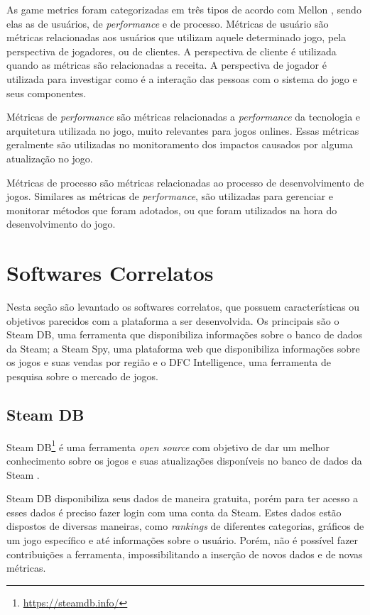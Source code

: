 As game metrics foram categorizadas em três tipos de acordo com Mellon \cite{game_metrics}, sendo elas as de usuários, de \textit{performance} e de processo.
Métricas de usuário são métricas relacionadas aos usuários que utilizam aquele determinado jogo, pela perspectiva de jogadores, ou de clientes. A perspectiva de cliente é utilizada quando as métricas são relacionadas a receita. A perspectiva de jogador é utilizada para investigar como é a interação das pessoas com o sistema do jogo e seus componentes.

Métricas de \textit{performance} são métricas relacionadas a \textit{performance} da tecnologia e arquitetura utilizada no jogo, muito relevantes para jogos onlines. Essas métricas geralmente são utilizadas no monitoramento dos impactos causados por alguma atualização no jogo.

Métricas de processo são métricas relacionadas ao processo de desenvolvimento de jogos. Similares as métricas de \textit{performance}, são utilizadas para gerenciar e monitorar métodos que foram adotados, ou que foram utilizados na hora do desenvolvimento do jogo. 
\section{Softwares Correlatos}
Nesta seção são levantado os softwares correlatos, que possuem características ou objetivos parecidos com a plataforma a ser desenvolvida. Os principais são o Steam DB, uma ferramenta que disponibiliza informações sobre o banco de dados da Steam; a Steam Spy, uma plataforma web que disponibiliza informações sobre os jogos e suas vendas por região e o DFC Intelligence, uma ferramenta de pesquisa sobre o mercado de jogos.
\subsection{Steam DB}
Steam DB\footnote[1]{\url{https://steamdb.info/}} é uma ferramenta \textit{open source} com objetivo de dar um melhor conhecimento sobre os jogos e suas atualizações disponíveis no banco de dados da Steam \cite{steam_db}.

Steam DB disponibiliza seus dados de maneira gratuita, porém para ter acesso a esses dados é preciso fazer login com uma conta da Steam. Estes dados estão dispostos de diversas maneiras, como \textit{rankings} de diferentes categorias, gráficos de um jogo específico e até informações sobre o usuário. Porém, não é possível fazer contribuições a ferramenta, impossibilitando a inserção de novos dados e de novas métricas.
